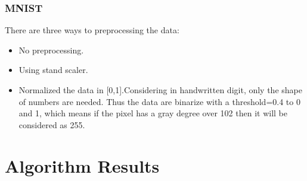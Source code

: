 \documentclass{article}
\begin{document}
\subsubsection{MNIST}
There are three ways to preprocessing the data:
\begin{itemize}
\item No preprocessing.
\item Using stand scaler.
\item Normalized the data in [0,1].Considering in handwritten digit, only the shape of numbers are needed. Thus the data are binarize with a threshold=0.4 to 0 and 1, which means if the pixel has a gray degree over 102 then it will be considered as 255.

\end{itemize}




\section{Algorithm Results}
\end{document}
